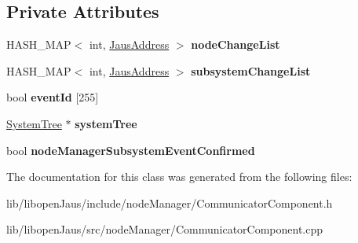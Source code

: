 \subsection*{\-Private \-Attributes}
\begin{DoxyCompactItemize}
\item 
\hypertarget{class_communicator_component_abe643d0157517901b7c962474b4a9a2a}{\-H\-A\-S\-H\-\_\-\-M\-A\-P$<$ int, \hyperlink{struct_jaus_address_struct}{\-Jaus\-Address} $>$ {\bfseries node\-Change\-List}}\label{class_communicator_component_abe643d0157517901b7c962474b4a9a2a}

\item 
\hypertarget{class_communicator_component_a769b8c377e830f9dd86219e8dbbe9aed}{\-H\-A\-S\-H\-\_\-\-M\-A\-P$<$ int, \hyperlink{struct_jaus_address_struct}{\-Jaus\-Address} $>$ {\bfseries subsystem\-Change\-List}}\label{class_communicator_component_a769b8c377e830f9dd86219e8dbbe9aed}

\item 
\hypertarget{class_communicator_component_aa291f8f174218a11f424c4168bbffd2a}{bool {\bfseries event\-Id} \mbox{[}255\mbox{]}}\label{class_communicator_component_aa291f8f174218a11f424c4168bbffd2a}

\item 
\hypertarget{class_communicator_component_a8fe3af8d677a3c0e86a5f1d4cf263d98}{\hyperlink{class_system_tree}{\-System\-Tree} $\ast$ {\bfseries system\-Tree}}\label{class_communicator_component_a8fe3af8d677a3c0e86a5f1d4cf263d98}

\item 
\hypertarget{class_communicator_component_ab574c5b39f6eb4d9e11bfa9ae69952e3}{bool {\bfseries node\-Manager\-Subsystem\-Event\-Confirmed}}\label{class_communicator_component_ab574c5b39f6eb4d9e11bfa9ae69952e3}

\end{DoxyCompactItemize}


\-The documentation for this class was generated from the following files\-:\begin{DoxyCompactItemize}
\item 
lib/libopen\-Jaus/include/node\-Manager/\-Communicator\-Component.\-h\item 
lib/libopen\-Jaus/src/node\-Manager/\-Communicator\-Component.\-cpp\end{DoxyCompactItemize}
